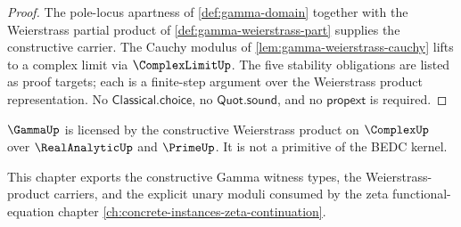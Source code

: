\begin{proof}
The pole-locus apartness of \autoref{def:gamma-domain} together with the Weierstrass partial product of \autoref{def:gamma-weierstrass-part} supplies the constructive carrier. The Cauchy modulus of \autoref{lem:gamma-weierstrass-cauchy} lifts to a complex limit via \(\ComplexLimitUp\). The five stability obligations are listed as proof targets; each is a finite-step argument over the Weierstrass product representation. No \(\mathsf{Classical.choice}\), no \(\mathsf{Quot.sound}\), and no \(\mathsf{propext}\) is required.
\end{proof}

\begin{corollary}
\label{cor:gamma-licensed-not-primitive}
\(\GammaUp\) is licensed by the constructive Weierstrass product on \(\ComplexUp\) over \(\RealAnalyticUp\) and \(\PrimeUp\). It is not a primitive of the BEDC kernel.
\end{corollary}

\begin{remark}
\label{rem:gamma-schema-horizon-discharge}
This chapter exports the constructive Gamma witness types, the Weierstrass-product carriers, and the explicit unary moduli consumed by the zeta functional-equation chapter \autoref{ch:concrete-instances-zeta-continuation}.
\end{remark}

